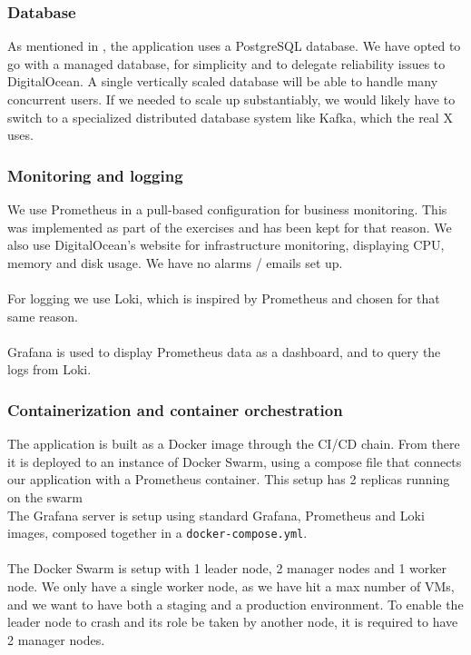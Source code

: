 \subsubsection{Database}
As mentioned in \cite{Design of the CSharp-MiniTwit application}, the application uses a PostgreSQL database. We have opted to go with a managed database, for simplicity and to delegate reliability issues to DigitalOcean. A single vertically scaled database will be able to handle many concurrent users. If we needed to scale up substantiably, we would likely have to switch to a specialized distributed database system like Kafka, which the real X uses\cite{kafka}.

\subsubsection*{Monitoring and logging}
We use Prometheus in a pull-based configuration for business monitoring. This was implemented as part of the exercises and has been kept for that reason. We also use DigitalOcean's website for infrastructure monitoring, displaying CPU, memory and disk usage. We have no alarms / emails set up.\\\\
For logging we use Loki, which is inspired by Prometheus and chosen for that same reason\cite{Loki}.\\\\
Grafana is used to display Prometheus data as a dashboard, and to query the logs from Loki.

\subsubsection{Containerization and container orchestration}
The application is built as a Docker image through the CI/CD chain. From there it is deployed to an instance of Docker Swarm, using a compose file that connects our application with a Prometheus container. This setup has 2 replicas running on the swarm \\
The Grafana server is setup using standard Grafana, Prometheus and Loki images, composed together in a \texttt{docker-compose.yml}.\\\\
The Docker Swarm is setup with 1 leader node, 2 manager nodes and 1 worker node. We only have a single worker node, as we have hit a max number of VMs, and we want to have both a staging and a production environment. To enable the leader node to crash and its role be taken by another node, it is required to have 2 manager nodes.\\\\

